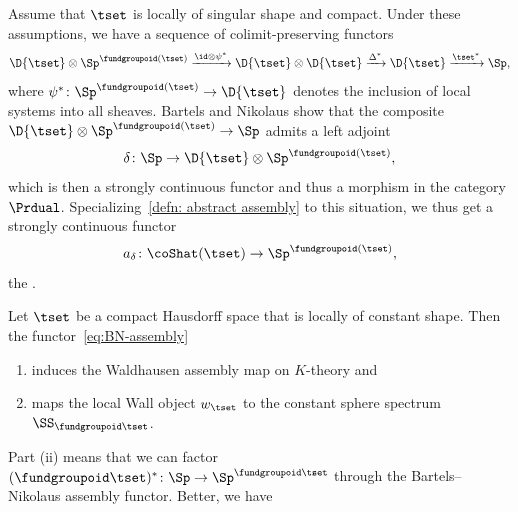 Assume that $\tset$ is locally of singular shape and compact. Under these assumptions, we have a sequence of colimit-preserving functors
\[
  \D{\tset}\otimes\Sp^{\fundgroupoid (\tset )}\xrightarrow{\id\otimes\psi^*}
  \D{\tset}\otimes \D{\tset}\xrightarrow{\Delta^*}\D{\tset}\xrightarrow{\tset^*}
  \Sp, 
\]
where $\psi^*\colon \Sp^{\fundgroupoid (\tset )}\to\D{\tset}$ denotes the inclusion of local systems into all sheaves. Bartels and Nikolaus show that the composite $\D{\tset}\otimes\Sp^{\fundgroupoid (\tset )}\to\Sp$ admits a left adjoint
\[
\delta\colon \Sp\to \D{\tset}\otimes\Sp^{\fundgroupoid (\tset )},
\]
which is then a strongly continuous functor and thus a morphism in the category $\Prdual$. Specializing~\cref{defn: abstract assembly} to this situation, we thus get a strongly continuous functor
\begin{equation}
  \label{eq:BN-assembly}
  a_\delta\colon\coShat (\tset )\to \Sp^{\fundgroupoid (\tset )},
\end{equation}
the .
\begin{thm}\label{thm: Bartels--Nikolaus geometric topology}
  Let $\tset$ be a compact Hausdorff space that is locally of constant shape.
  Then the functor~\eqref{eq:BN-assembly}
  \begin{enumerate}[label=(\roman*)]
  \item induces the Waldhausen assembly map on $K$-theory and
  \item maps the local Wall object $w_\tset$ to the constant sphere spectrum $\SS_{\fundgroupoid \tset}$.
  \end{enumerate}
\end{thm}
Part (ii) means that we can factor $(\fundgroupoid\tset )^*\colon\Sp\to\Sp^{\fundgroupoid\tset}$ through the Bartels--Nikolaus assembly functor. Better, we have
